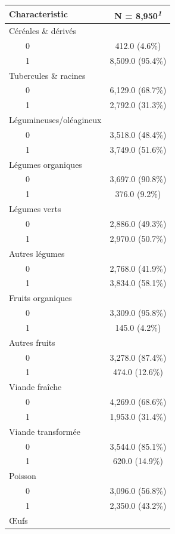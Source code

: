 \documentclass[
]{article}
\begin{document}
\begin{table}[!t]
\fontsize{9.8pt}{11.7pt}\selectfont
\begin{tabular*}{\linewidth}{@{\extracolsep{\fill}}lc}
\toprule
\textbf{Characteristic} & \textbf{N = 8,950}\textsuperscript{\textit{1}} \\ 
\midrule\addlinespace[2.5pt]
Céréales \& dérivés &  \\ 
    0 & 412.0 (4.6\%) \\ 
    1 & 8,509.0 (95.4\%) \\ 
Tubercules \& racines &  \\ 
    0 & 6,129.0 (68.7\%) \\ 
    1 & 2,792.0 (31.3\%) \\ 
Légumineuses/oléagineux &  \\ 
    0 & 3,518.0 (48.4\%) \\ 
    1 & 3,749.0 (51.6\%) \\ 
Légumes organiques &  \\ 
    0 & 3,697.0 (90.8\%) \\ 
    1 & 376.0 (9.2\%) \\ 
Légumes verts &  \\ 
    0 & 2,886.0 (49.3\%) \\ 
    1 & 2,970.0 (50.7\%) \\ 
Autres légumes &  \\ 
    0 & 2,768.0 (41.9\%) \\ 
    1 & 3,834.0 (58.1\%) \\ 
Fruits organiques &  \\ 
    0 & 3,309.0 (95.8\%) \\ 
    1 & 145.0 (4.2\%) \\ 
Autres fruits &  \\ 
    0 & 3,278.0 (87.4\%) \\ 
    1 & 474.0 (12.6\%) \\ 
Viande fraîche &  \\ 
    0 & 4,269.0 (68.6\%) \\ 
    1 & 1,953.0 (31.4\%) \\ 
Viande transformée &  \\ 
    0 & 3,544.0 (85.1\%) \\ 
    1 & 620.0 (14.9\%) \\ 
Poisson &  \\ 
    0 & 3,096.0 (56.8\%) \\ 
    1 & 2,350.0 (43.2\%) \\ 
Œufs &  \\ 

\end{tabular*}
\end{table}
\end{document}
